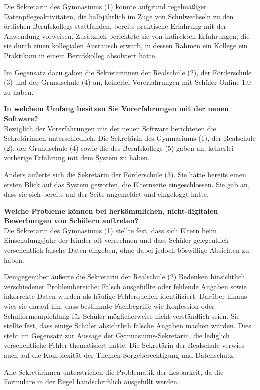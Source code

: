 Die Sekretärin des Gymnasiums (1) konnte aufgrund regelmäßiger Datenpflegeaktivitäten, die halbjährlich im Zuge von Schulwechseln zu den örtlichen Berufskollegs stattfanden, bereits praktische Erfahrung mit der Anwendung vorweisen. Zusätzlich berichtete sie von indirekten Erfahrungen, die sie durch einen kollegialen Austausch erwarb, in dessen Rahmen ein Kollege ein Praktikum in einem Berufskolleg absolviert hatte.

Im Gegensatz dazu gaben die Sekretärinnen der Realschule (2), der Förderschule (3) und der Grundschule (4) an, keinerlei Vorerfahrungen mit Schüler Online 1.0 zu haben.


\textbf{In welchem Umfang besitzen Sie Vorerfahrungen mit der neuen Software?}\\
Bezüglich der Vorerfahrungen mit der neuen Software berichteten die Sekretärinnen unterschiedlich. Die Sekretärin des Gymnasiums (1), der Realschule (2), der Grundschule (4) sowie die des Berufskollegs (5) gaben an, keinerlei vorherige Erfahrung mit dem System zu haben.

Anders äußerte sich die Sekretärin der Förderschule (3). Sie hatte bereits einen ersten Blick auf das System geworfen, die Elternseite eingeschlossen. Sie gab an, dass sie sich bereits auf der Seite angemeldet und eingeloggt hatte.

\textbf{Welche Probleme können bei herkömmlichen, nicht-digitalen Bewerbungen von Schülern auftreten?}\\
Die Sekretärin des Gymnasiums (1) stellte fest, dass sich Eltern beim Einschulungsjahr der Kinder oft verrechnen und dass Schüler gelegentlich versehentlich falsche Daten eingeben, ohne dabei jedoch böswillige Absichten zu haben.

Demgegenüber äußerte die Sekretärin der Realschule (2) Bedenken hinsichtlich verschiedener Problembereiche: Falsch ausgefüllte oder fehlende Angaben sowie inkorrekte Daten wurden als häufige Fehlerquellen identifiziert. Darüber hinaus wies sie darauf hin, dass bestimmte Fachbegriffe wie \glqq Konfession\grqq{} oder \glqq Schulformempfehlung\grqq{} für Schüler möglicherweise nicht verständlich seien. Sie stellte fest, dass einige Schüler absichtlich falsche Angaben machen würden. Dies steht im Gegensatz zur Aussage der Gymnasiums-Sekretärin, die lediglich versehentliche Fehler thematisiert hatte. Die Sekretärin der Realschule verwies auch auf die Komplexität der Themen Sorgeberechtigung und Datenschutz.

Alle Sekretärinnen unterstrichen die Problematik der Lesbarkeit, da die Formulare in der Regel handschriftlich ausgefüllt werden.

